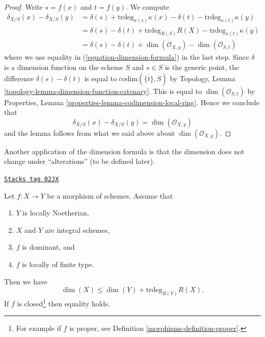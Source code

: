 \begin{proof}
\medskip\noindent
Write $s = f(x)$ and $t = f(y)$. We compute
\begin{align*}
\delta_{X/S}(x) - \delta_{X/S}(y)
& =
\delta(s) + \text{trdeg}_{\kappa(s)} \kappa(x)
- \delta(t) - \text{trdeg}_{\kappa(t)} \kappa(y) \\
& =
\delta(s) - \delta(t) +
\text{trdeg}_{R(S)} R(X) - \text{trdeg}_{\kappa(t)} \kappa(y) \\
& =
\delta(s) - \delta(t) + \dim(\mathcal{O}_{X, y})
- \dim(\mathcal{O}_{S, t})
\end{align*}
where we use equality in (\ref{equation-dimension-formula}) in
the last step. Since $\delta$ is a dimension function on the scheme $S$
and $s \in S$ is the generic point, the difference
$\delta(s) - \delta(t)$ is equal to $\text{codim}(\overline{\{t\}}, S)$ by
Topology, Lemma \ref{topology-lemma-dimension-function-catenary}.
This is equal to $\dim(\mathcal{O}_{S, t})$ by
Properties, Lemma
\ref{properties-lemma-codimension-local-ring}.
Hence we conclude that
$$
\delta_{X/S}(x) - \delta_{X/S}(y) = \dim(\mathcal{O}_{X, y})
$$
and the lemma follows from what we said above about $\dim(\mathcal{O}_{X, y})$.
\end{proof}

Another application of the dimension formula is that the dimension does not
change under ``alterations'' (to be defined later).

\begin{lemma}
\label{morphisms-lemma-alteration-dimension}
\href{https://stacks.math.columbia.edu/tag/02JX}{\texttt{Stacks tag 02JX}}

Let $f : X \to Y$ be a morphism of schemes. Assume that
\begin{enumerate}
\item $Y$ is locally Noetherian,
\item $X$ and $Y$ are integral schemes,
\item $f$ is dominant, and
\item $f$ is locally of finite type.
\end{enumerate}
Then we have
$$
\dim(X) \leq \dim(Y) + \text{trdeg}_{R(Y)} R(X).
$$
If $f$ is closed\footnote{For example if $f$ is proper, see
Definition \ref{morphisms-definition-proper}.} then equality holds.
\end{lemma}

